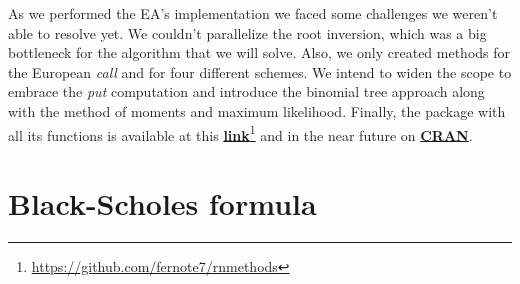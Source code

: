 \documentclass[12pt,oneside]{reedthesis}
\theoremstyle{definition}
\theoremstyle{definition}
\theoremstyle{remark}
\begin{document}
  As we performed the EA's implementation we faced some challenges we
  weren't able to resolve yet. We couldn't parallelize the root inversion,
  which was a big bottleneck for the algorithm that we will solve. Also,
  we only created methods for the European \emph{call} and for four
  different schemes. We intend to widen the scope to embrace the
  \emph{put} computation and introduce the binomial tree approach along
  with the method of moments and maximum likelihood. Finally, the package
  with all its functions is available at this
  \href{<https://github.com/fernote7/rnmethods>}{\textbf{link}}\footnote{\url{https://github.com/fernote7/rnmethods}}
  and in the near future on
  \href{<https://cran.r-project.org/>}{\textbf{CRAN}}.
  
  \appendix
  
  \chapter{Black-Scholes formula}\label{bsformula}
  
\end{document}
